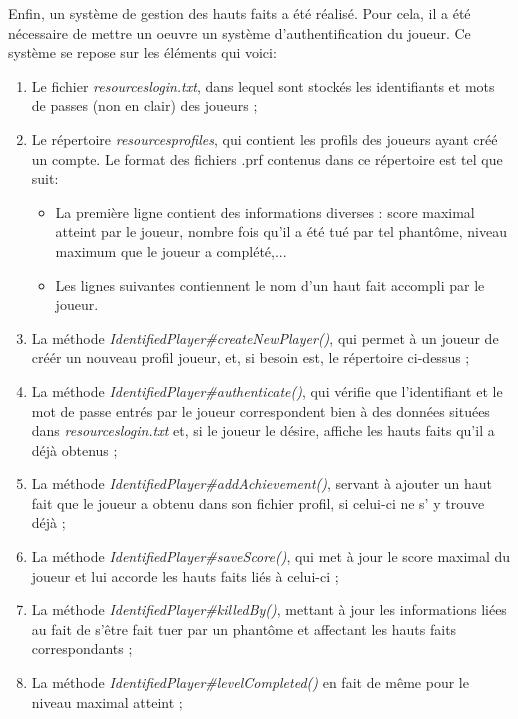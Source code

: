 \documentclass[12pt, openany]{report}
\begin{document}
Enfin, un système de gestion des hauts faits a été réalisé. Pour cela, il a été nécessaire de mettre un oeuvre un système d'authentification du joueur.
Ce système se repose sur les éléments qui voici:

\begin{enumerate}
\item Le fichier \mbox{\textit{resources\\login.txt}}, dans lequel sont stockés les identifiants et mots de passes (non en clair) des joueurs ;
\item Le répertoire \mbox{\textit{resources\\profiles\\}}, qui contient les profils des joueurs ayant créé un compte.
Le format des fichiers .prf contenus dans ce répertoire est tel que suit: 
\begin{itemize}
\item La première ligne contient des informations diverses : score maximal atteint par le joueur, nombre fois qu'il a été tué par tel phantôme, niveau maximum que le joueur a complété,...
\item Les lignes suivantes contiennent le nom d'un haut fait accompli par le joueur.
\end{itemize}
\item La méthode \mbox{\textit{IdentifiedPlayer\#createNewPlayer()}}, qui permet à un joueur de créér un nouveau profil joueur, et, si besoin est, le répertoire ci-dessus ;
\item La méthode \mbox{\textit{IdentifiedPlayer\#authenticate()}}, qui vérifie que l'identifiant et le mot de passe entrés par le joueur correspondent bien à des données situées dans \mbox{\textit{resources\\login.txt}} et, si le joueur le désire, affiche les hauts faits qu'il a déjà obtenus ;
\item La méthode \mbox{\textit{IdentifiedPlayer\#addAchievement()}}, servant à ajouter un haut fait que le joueur a obtenu dans son fichier profil, si celui-ci ne s' y trouve déjà ;
\item La méthode \mbox{\textit{IdentifiedPlayer\#saveScore()}}, qui met à jour le score maximal du joueur et lui accorde les hauts faits liés à celui-ci ;
\item La méthode \mbox{\textit{IdentifiedPlayer\#killedBy()}}, mettant à jour les informations liées au fait de s'être fait tuer par un phantôme et affectant les hauts faits correspondants ;
\item La méthode \mbox{\textit{IdentifiedPlayer\#levelCompleted()}} en fait de même pour le niveau maximal atteint ;

\end{enumerate}
\end{document}
